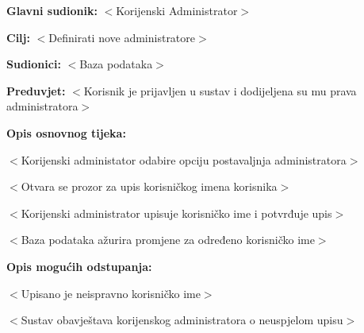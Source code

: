 					\noindent {}
					\begin{packed_item}
	
						\item \textbf{Glavni sudionik: }$<$Korijenski Administrator$>$
						\item  \textbf{Cilj:} $<$Definirati nove administratore$>$
						\item  \textbf{Sudionici:} $<$Baza podataka$>$
						\item  \textbf{Preduvjet:} $<$Korisnik je prijavljen u sustav i dodijeljena su mu prava administratora$>$
						\item  \textbf{Opis osnovnog tijeka:}
						
						\item[] \begin{packed_enum}
	
							\item $<$Korijenski administator odabire opciju postavaljnja administratora$>$
							\item $<$Otvara se prozor za upis korisničkog imena korisnika$>$
							\item $<$Korijenski administrator upisuje korisničko ime i potvrđuje upis$>$
							\item $<$Baza podataka ažurira promjene za određeno korisničko ime$>$
						\end{packed_enum}

						\item  \textbf{Opis mogućih odstupanja:}
						
						\item[] \begin{packed_item}
	
							\item[3.a] $<$Upisano je neispravno korisničko ime$>$
							\item[] \begin{packed_enum}
								
								\item $<$Sustav obavještava korijenskog administratora o neuspjelom upisu$>$
								
							\end{packed_enum}
						\end{packed_item}
						
					\end{packed_item}

